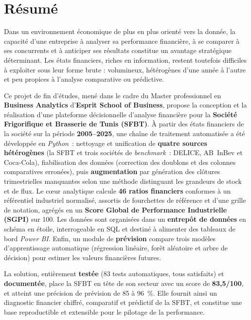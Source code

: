 \chapter*{Résumé}

\par Dans un environnement économique de plus en plus orienté vers la donnée, la
capacité d'une entreprise à analyser sa performance financière, à se comparer à
ses concurrents et à anticiper ses résultats constitue un avantage stratégique
déterminant. Les états financiers, riches en information, restent toutefois
difficiles à exploiter sous leur forme brute : volumineux, hétérogènes d'une
année à l'autre et peu propices à l'analyse comparative ou prédictive.

\par Ce projet de fin d'études, mené dans le cadre du Master professionnel en
\textbf{Business Analytics} d'\textbf{Esprit School of Business}, propose la
conception et la réalisation d'une plateforme décisionnelle d'analyse financière
pour la \textbf{Société Frigorifique et Brasserie de Tunis (SFBT)}. À partir des
états financiers de la société sur la période \textbf{2005--2025}, une chaîne de
traitement automatisée a été développée en \textit{Python}~: nettoyage et
unification de \textbf{quatre sources hétérogènes} (la SFBT et trois sociétés de
\textit{benchmark}~: DELICE, AB~InBev et Coca-Cola), fiabilisation des données
(correction des doublons et des colonnes comparatives erronées), puis
\textbf{augmentation} par génération des clôtures trimestrielles manquantes selon
une méthode distinguant les grandeurs de stock et de flux. Le cœur analytique
calcule \textbf{46 ratios financiers} conformes à un référentiel industriel
normalisé, assortis de fourchettes de référence et d'une grille de notation,
agrégés en un \textbf{Score Global de Performance Industrielle (SGPI)} sur 100.
Les données sont organisées dans un \textbf{entrepôt de données} en schéma en
étoile, interrogeable en SQL et destiné à alimenter des tableaux de bord
\textit{Power BI}. Enfin, un module de \textbf{prévision} compare trois modèles
d'apprentissage automatique (régression linéaire, forêt aléatoire et arbre de
décision) pour estimer les valeurs financières futures.

\par La solution, entièrement \textbf{testée} (83 tests automatiques, tous
satisfaits) et \textbf{documentée}, place la SFBT en tête de son secteur avec un
score de \textbf{83,5/100}, et atteint une précision de prévision de 85 à 96~\%.
Elle fournit ainsi un diagnostic financier chiffré, comparatif et prédictif de
la SFBT, et constitue une base reproductible et extensible pour le pilotage de
la performance.

